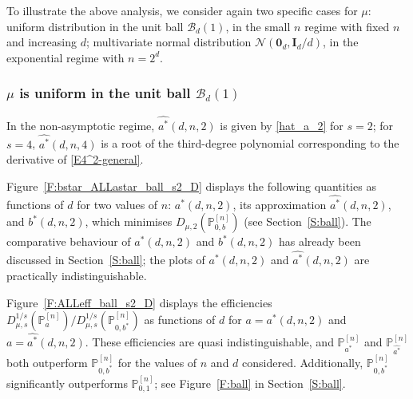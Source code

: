 \documentclass{article}
\def\Ib{\mathbf{I}}
\def\PP{\mathbb{P}}
\def\SB{{\mathscr B}}
\def\0b{\mathbf{0}}
\def\Rb{\mathbf{R}}
\def\SN{{\mathcal N}}
\begin{document}
To illustrate the above analysis, we consider again two specific cases for $\mu$: uniform distribution in the unit ball $\SB_d(1)$, in the small $n$ regime with fixed $n$ and increasing $d$; multivariate normal distribution $\SN(\0b_d, \Ib_d/d)$, in the exponential regime with $n = 2^d$.


\subsubsection{$\mu$ is uniform in the unit ball $\SB_d(1)$} \label{S:extreme-value-ball}


In the non-asymptotic regime, $\widehat{a^*}(d,n,2)$ is given by \eqref{hat_a_2} for $s=2$; for $s=4$, $\widehat{a^*}(d,n,4)$ is a root of the third-degree polynomial corresponding to the derivative of \eqref{E4^2-general}.

Figure~\ref{F:bstar_ALLastar_ball_s2_D} displays the following quantities as functions of $d$ for two values of $n$: $a^*(d,n,2)$, its approximation $\widehat{a^*}(d,n,2)$,
and $b^*(d,n,2)$, which minimises $D_{\mu,2}(\PP_{0,b}^{[n]})$ (see Section~\ref{S:ball}). The comparative behaviour of $a^*(d,n,2)$ and $b^*(d,n,2)$ has already been discussed in Section~\ref{S:ball}; the plots of $a^*(d,n,2)$ and $\widehat{a^*}(d,n,2)$ are practically indistinguishable.

Figure~\ref{F:ALLeff_ball_s2_D} displays the efficiencies $D_{\mu,s}^{1/s}(\PP_a^{[n]})/D_{\mu,s}^{1/s}(\PP_{0,b^*}^{[n]})$ as functions of $d$ for $a=a^*(d,n,2)$ and $a=\widehat{a^*}(d,n,2)$. These efficiencies are quasi indistinguishable, and $\PP_{a^*}^{[n]}$ and $\PP_{\widehat{a^*}}^{[n]}$ both outperform $\PP_{0,b^*}^{[n]}$ for the values of $n$ and $d$ considered. Additionally, $\PP_{0,b^*}^{[n]}$ significantly outperforms $\PP_{0,1}^{[n]}$; see Figure~\ref{F:ball} in Section~\ref{S:ball}.
\end{document}
